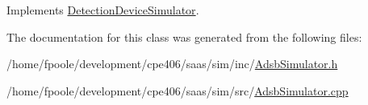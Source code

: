 Implements \hyperlink{class_detection_device_simulator_ae9e5d29238a9bcc104b4004b52ddffd9}{Detection\+Device\+Simulator}.



The documentation for this class was generated from the following files\+:\begin{DoxyCompactItemize}
\item 
/home/fpoole/development/cpe406/saas/sim/inc/\hyperlink{_adsb_simulator_8h}{Adsb\+Simulator.\+h}\item 
/home/fpoole/development/cpe406/saas/sim/src/\hyperlink{_adsb_simulator_8cpp}{Adsb\+Simulator.\+cpp}\end{DoxyCompactItemize}
